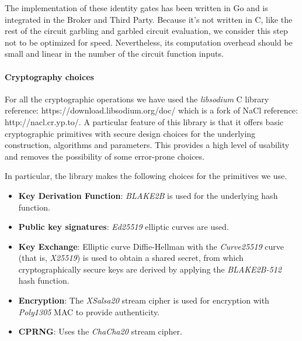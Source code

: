 The implementation of these identity gates has been written in Go and is
integrated in the Broker and Third Party.  Because it's not written in C, like
the rest of the circuit garbling and garbled circuit evaluation, we consider
this step not to be optimized for speed.  Nevertheless, its computation
overhead should be small and linear in the number of the circuit function
inputs.


\paragraph{Cryptography choices}

For all the cryptographic operations we have used the \emph{libsodium} C
library {reference: https://download.libsodium.org/doc/} which is a fork of
NaCl {reference: http://nacl.cr.yp.to/}.  A particular feature of this library
is that it offers basic cryptographic primitives with secure design choices
for the underlying construction, algorithms and parameters.  This provides a
high level of usability and removes the possibility of some error-prone
choices.

In particular, the library makes the following choices for the primitives we use.

\begin{itemize}
  \item \textbf{Key Derivation Function}: \emph{BLAKE2B} is used for the
    underlying hash function.
  \item \textbf{Public key signatures}: \emph{Ed25519} elliptic curves are used.
  \item \textbf{Key Exchange}: Elliptic curve Diffie-Hellman with the
    \emph{Curve25519} curve (that is, \emph{X25519}) is used to obtain a shared
    secret, from which cryptographically secure keys are derived by applying
    the \emph{BLAKE2B-512} hash function.
  \item \textbf{Encryption}: The \emph{XSalsa20} stream cipher is used for
    encryption with \emph{Poly1305} MAC to provide authenticity.
  \item \textbf{CPRNG}: Uses the \emph{ChaCha20} stream cipher.
\end{itemize}
